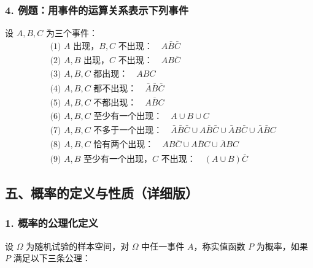 \documentclass[12pt,a4paper]{ctexart}
\begin{document}
\subsubsection{4. 例题：用事件的运算关系表示下列事件}
设 $A, B, C$ 为三个事件：
\begin{align*}
     & \text{(1) }A\text{ 出现，}B, C\text{ 不出现：}\quad \boxed{A\bar{B}\bar{C}}                                                                 \\
     & \text{(2) }A, B\text{ 出现，}C\text{ 不出现：}\quad \boxed{AB\bar{C}}                                                                       \\
     & \text{(3) }A, B, C\text{ 都出现：}\quad \boxed{ABC}                                                                                      \\
     & \text{(4) }A, B, C\text{ 都不出现：}\quad \boxed{\bar{A}\bar{B}\bar{C}}                                                                   \\
     & \text{(5) }A, B, C\text{ 不都出现：}\quad \boxed{\overline{ABC}}                                                                          \\
     & \text{(6) }A, B, C\text{ 至少有一个出现：}\quad \boxed{A \cup B \cup C}                                                                      \\
     & \text{(7) }A, B, C\text{ 不多于一个出现：}\quad \boxed{\bar{A}\bar{B}\bar{C} \cup A\bar{B}\bar{C} \cup \bar{A}B\bar{C} \cup \bar{A}\bar{B}C} \\
     & \text{(8) }A, B, C\text{ 恰有两个出现：}\quad \boxed{AB\bar{C} \cup A\bar{B}C \cup \bar{A}BC}                                               \\
     & \text{(9) }A, B\text{ 至少有一个出现，}C\text{ 不出现：}\quad \boxed{(A\cup B)\bar{C}}
\end{align*}

\subsection{五、概率的定义与性质（详细版）}

\subsubsection{1. 概率的公理化定义}
设 $\Omega$ 为随机试验的样本空间，对 $\Omega$ 中任一事件 $A$，称实值函数 $P$ 为概率，如果 $P$ 满足以下三条公理：
\end{document}
